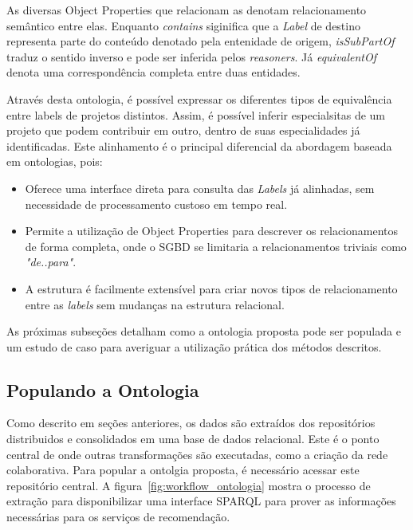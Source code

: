 \documentclass[sigconf]{acmart}
\begin{document}
As diversas Object Properties que relacionam as  denotam relacionamento semântico entre elas. Enquanto \textit{contains} siginifica que a \textit{Label} de destino representa parte do conteúdo denotado pela entenidade de origem, \textit{isSubPartOf} traduz o sentido inverso e pode ser inferida pelos \textit{reasoners}. Já \textit{equivalentOf} denota uma correspondência completa entre duas entidades.

Através desta ontologia, é possível expressar os diferentes tipos de equivalência entre labels de projetos distintos. Assim, é possível inferir especialsitas de um projeto que podem contribuir em outro, dentro de suas especialidades já identificadas. Este alinhamento é o principal diferencial da abordagem baseada em ontologias, pois:

\begin{itemize}
  \item Oferece uma interface direta para consulta das \textit{Labels} já alinhadas, sem necessidade de processamento custoso em tempo real.
  \item Permite a utilização de Object Properties para descrever os relacionamentos de forma completa, onde o SGBD se limitaria a relacionamentos triviais como \textit{"de..para"}.
  \item A estrutura é facilmente extensível para criar novos tipos de relacionamento entre as \textit{labels} sem mudanças na estrutura relacional.
\end{itemize}

As próximas subseções detalham como a ontologia proposta pode ser populada e um estudo de caso para averiguar a utilização prática dos métodos descritos.

\subsection{Populando a Ontologia}

Como descrito em seções anteriores, os dados são extraídos dos repositórios distribuidos e consolidados em uma base de dados relacional. Este é o ponto central de onde outras transformações são executadas, como a criação da rede colaborativa. Para popular a ontolgia proposta, é necessário acessar este repositório central. A figura~\ref{fig:workflow_ontologia} mostra o processo de extração para disponibilizar uma interface SPARQL para prover as informações necessárias para os serviços de recomendação.
\end{document}
